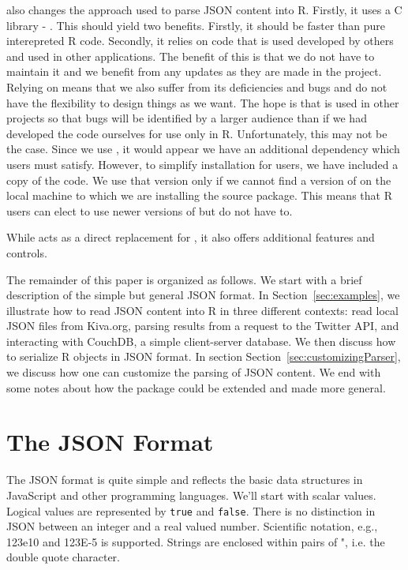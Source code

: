 \documentclass[article]{jss}
\begin{document}
 also changes the approach used to parse
JSON content into R. Firstly, it uses a C library -
 \citep{bib:libjson}.  This should yield two
benefits. Firstly, it should be faster than pure interepreted R
code. Secondly, it relies on code that is used developed by others and
used in other applications.  The benefit of this is that we do not
have to maintain it and we benefit from any updates as they are made
in the  project.  Relying on 
means that we also suffer from its deficiencies and bugs and do not
have the flexibility to design things as we want. The hope is that
 is used in other projects so that bugs
will be identified by a larger audience than if we had developed the
code ourselves for use only in R.  Unfortunately, this may not be the case.
Since we use , it
would appear we have an additional dependency which users must
satisfy.  However, to simplify installation for users, we have
included a copy of the  code. We use that version
only if we cannot find a version of  on the local
machine to which we are installing the source package.  This means
that R users can elect to use newer versions of  but
do not have to.

While  acts as a direct replacement
for , it also offers additional features and controls.

The remainder of this paper is organized as follows.
We start with a brief description of the simple but general
JSON format. In Section~\ref{sec:examples}, we
illustrate how to read JSON content into R 
in three different contexts: read local JSON files from Kiva.org, 
parsing results from a request to the Twitter API,
and interacting with CouchDB, a simple client-server database.
We then discuss how to serialize R objects in JSON format.
In section Section~\ref{sec:customizingParser},
we discuss how one can customize the parsing of JSON content.
We end with some notes about how the package could be extended
and made more general.

\section{The JSON Format}

The JSON format is quite simple and reflects the basic data structures
in JavaScript and other programming languages.
We'll start with scalar values.
Logical values are represented by 
\verb+true+ and \verb+false+.
There is no distinction in JSON between
an integer and a real valued number.
Scientific notation, e.g., 123e10 and 123E-5 is supported.
Strings are enclosed within pairs of ", i.e. the double quote character.
\end{document}
